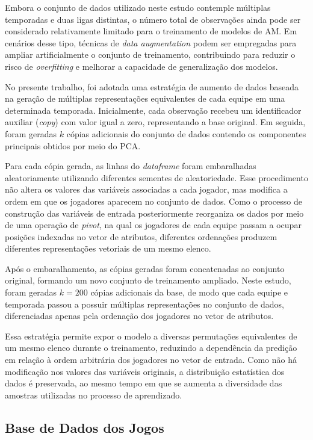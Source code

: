 Embora o conjunto de dados utilizado neste estudo contemple múltiplas temporadas e duas ligas distintas, 
o número total de observações ainda pode ser considerado relativamente limitado para o treinamento de 
modelos de AM. Em cenários desse tipo, técnicas de \textit{data augmentation} podem 
ser empregadas para ampliar artificialmente o conjunto de treinamento, contribuindo para reduzir o risco 
de \textit{overfitting} e melhorar a capacidade de generalização dos modelos.

No presente trabalho, foi adotada uma estratégia de aumento de dados baseada na geração de múltiplas 
representações equivalentes de cada equipe em uma determinada temporada. Inicialmente, cada observação 
recebeu um identificador auxiliar (\textit{copy}) com valor igual a zero, representando a base original. 
Em seguida, foram geradas $k$ cópias adicionais do conjunto de dados contendo os componentes principais 
obtidos por meio do PCA.

Para cada cópia gerada, as linhas do \textit{dataframe} foram embaralhadas aleatoriamente utilizando 
diferentes sementes de aleatoriedade. Esse procedimento não altera os valores das variáveis associadas 
a cada jogador, mas modifica a ordem em que os jogadores aparecem no conjunto de dados. Como o processo 
de construção das variáveis de entrada posteriormente reorganiza os dados por meio de uma operação de 
\textit{pivot}, na qual os jogadores de cada equipe passam a ocupar posições indexadas no vetor de 
atributos, diferentes ordenações produzem diferentes representações vetoriais de um mesmo elenco.

Após o embaralhamento, as cópias geradas foram concatenadas ao conjunto original, formando um novo 
conjunto de treinamento ampliado. Neste estudo, foram geradas $k = 200$ cópias adicionais da base, de 
modo que cada equipe e temporada passou a possuir múltiplas representações no conjunto de dados, 
diferenciadas apenas pela ordenação dos jogadores no vetor de atributos.

Essa estratégia permite expor o modelo a diversas permutações equivalentes de um mesmo elenco durante o 
treinamento, reduzindo a dependência da predição em relação à ordem arbitrária dos jogadores no vetor de 
entrada. Como não há modificação nos valores das variáveis originais, a distribuição estatística dos dados 
é preservada, ao mesmo tempo em que se aumenta a diversidade das amostras utilizadas no processo de 
aprendizado.

\subsection{Base de Dados dos Jogos}

